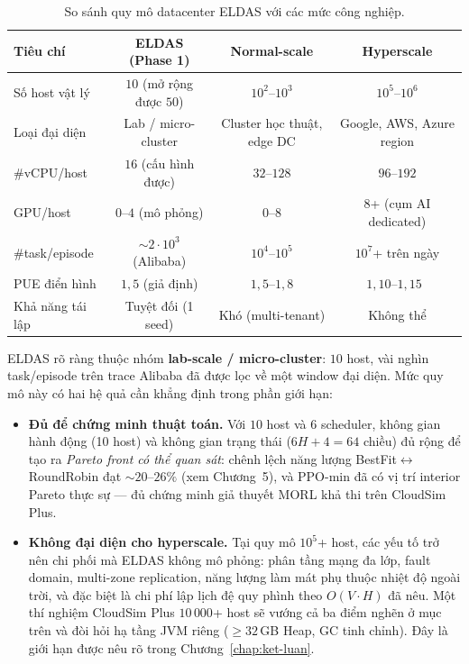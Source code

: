 \begin{table}[H]
  \centering
  \caption{So sánh quy mô datacenter ELDAS với các mức công nghiệp.}
  \label{tab:datacenter-scale}
  \footnotesize
  \begin{tabular}{lccc}
    \toprule
    \textbf{Tiêu chí} & \textbf{ELDAS (Phase 1)} &
        \textbf{Normal-scale} & \textbf{Hyperscale} \\
    \midrule
    Số host vật lý        & $10$ (mở rộng được $50$)
                          & $10^2$--$10^3$
                          & $10^5$--$10^6$ \\
    Loại đại diện         & Lab / micro-cluster
                          & Cluster học thuật, edge DC
                          & Google, AWS, Azure region \\
    \#vCPU/host           & $16$ (cấu hình được)
                          & $32$--$128$
                          & $96$--$192$ \\
    GPU/host              & $0$--$4$ (mô phỏng)
                          & $0$--$8$
                          & $8$+ (cụm AI dedicated) \\
    \#task/episode        & $\sim 2 \cdot 10^3$ (Alibaba)
                          & $10^4$--$10^5$
                          & $10^7$+ trên ngày \\
    PUE điển hình         & $1{,}5$ (giả định)
                          & $1{,}5$--$1{,}8$
                          & $1{,}10$--$1{,}15$~\cite{google2023datacenter} \\
    Khả năng tái lập      & Tuyệt đối (1 seed)
                          & Khó (multi-tenant)
                          & Không thể \\
    \bottomrule
  \end{tabular}
\end{table}

ELDAS rõ ràng thuộc nhóm \textbf{lab-scale / micro-cluster}: $10$
host, vài nghìn task/episode trên trace Alibaba đã được lọc về một
window đại diện. Mức quy mô này có hai hệ quả cần khẳng định trong
phần giới hạn:
\begin{itemize}
  \item \textbf{Đủ để chứng minh thuật toán.} Với $10$ host và
        $6$ scheduler, không gian hành động (10 host) và không
        gian trạng thái ($6H+4 = 64$ chiều) đủ rộng để tạo ra
        \emph{Pareto front có thể quan sát}: chênh lệch năng lượng
        BestFit$\leftrightarrow$RoundRobin đạt $\sim 20$--$26\%$ (xem
        Chương~5), và PPO-min đã có vị trí interior Pareto thực sự
        --- đủ chứng minh giả thuyết MORL khả thi trên CloudSim
        Plus.
  \item \textbf{Không đại diện cho hyperscale.} Tại quy mô
        $10^5$+ host, các yếu tố trở nên chi phối mà ELDAS không
        mô phỏng: phân tầng mạng đa lớp, fault domain, multi-zone
        replication, năng lượng làm mát phụ thuộc nhiệt độ ngoài
        trời, và đặc biệt là chi phí lập lịch đệ quy phình theo
        $O(V \cdot H)$ đã nêu. Một thí nghiệm CloudSim Plus
        $10\,000$+ host sẽ vướng cả ba điểm nghẽn ở mục trên và đòi
        hỏi hạ tầng JVM riêng ($\geq 32$\,GB Heap, GC tinh chỉnh).
        Đây là giới hạn được nêu rõ trong Chương~\ref{chap:ket-luan}.
\end{itemize}

